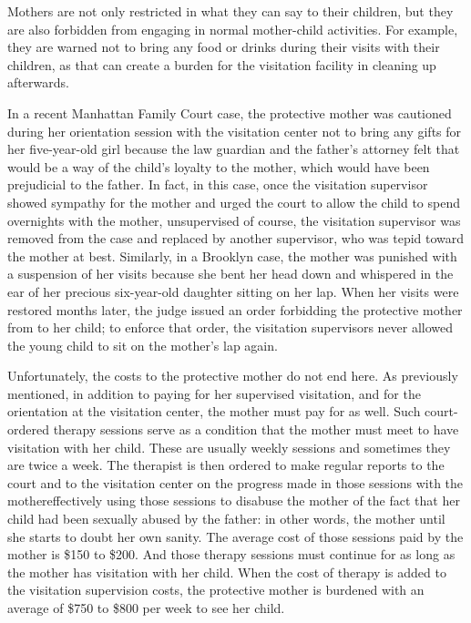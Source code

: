 \vspace{3em}


\noindent{}Mothers are not only restricted in what they can say to their children,
but they are also forbidden from engaging in normal mother-child 
activities. For example, they are warned not to bring any food or drinks
during their visits with their children, as that can create a burden for the
visitation facility in cleaning up afterwards. \pfl{}

In a recent Manhattan Family Court case, the protective mother was
cautioned during her orientation session with the visitation center not
to bring any gifts for her five-year-old girl because the law guardian
and the father's attorney felt that would be a way of  the
child's loyalty to the mother, which would have been prejudicial to the
father. In fact, in this case, once the visitation supervisor showed sympathy for the mother and urged the court to allow the child to spend
overnights with the mother, unsupervised of course, the visitation supervisor was removed from the case and replaced by another supervisor,
who was tepid toward the mother at best. Similarly, in a Brooklyn case,
the mother was punished with a suspension of her visits because she bent
her head down and whispered  in the ear of her precious
six-year-old daughter sitting on her lap. When her visits were restored months later, the judge issued an order forbidding the protective
mother from  to her child; to enforce that order, the visitation supervisors never allowed the young child to sit on the mother's lap
again. \pfl{}

\vspace{1em}

\vspace{-.5em}

\noindent{}Unfortunately, the costs to the protective mother do not end here. As
previously mentioned, in addition to paying for her supervised visitation, and for the orientation at the visitation center, the mother must
pay for  as well. 
Such court-ordered therapy sessions serve
as a condition that the mother must meet to have visitation with her
child. These are usually weekly sessions and sometimes they are twice a
week. The therapist is then ordered to make regular reports to the court
and to the visitation center on the progress made in those sessions with
the mother\mdash{}effectively using those sessions to disabuse the mother of
the fact that her child had been sexually abused by the father: in other words,
 the mother until she starts to doubt her own sanity. The average cost of those  sessions paid by the mother is \$150 to \$200.
And those therapy sessions must continue for as long as the mother has
visitation with her child. When the cost of therapy is added to the visitation
supervision costs, the protective mother is burdened with an average of
\$750 to \$800 per week to see her child. \pfl{}

